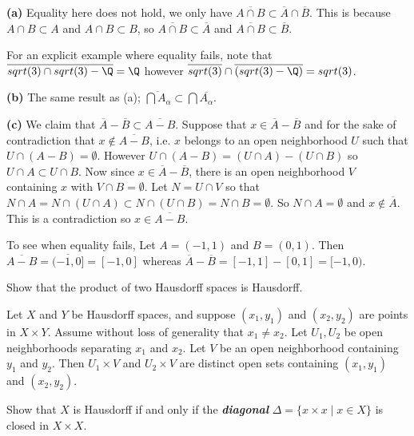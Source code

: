 \documentclass[11pt,letterpaper]{article}
\begin{document}
\begin{changemargin}{1em}{1em}
    \textbf{(a)} Equality here does not hold, we only have $\overline{A\cap B} \subset \overline{A} \cap \overline{B}$. This is because $A\cap B\subset A$ and $A\cap B\subset B$, so $\overline{A\cap B}\subset \overline{A} $ and $\overline{A\cap B}\subset \overline{B} $.
    
    For an explicit example where equality fails, note that $\overline{\R\cap \R-\Q}=\Q$ however $\overline{\R} \cap \overline{(\R-\Q)} = \R$.  
    
    \textbf{(b)} The same result as (a); $\overline{\bigcap A_\alpha} \subset \bigcap \overline{A_\alpha}$.
    
    \textbf{(c)} We claim that $\overline{A} - \overline{B} \subset \overline{A - B}$. Suppose that $x\in \overline{A}-\overline{B}$ and for the sake of contradiction that $x\not\in \overline{A - B}$, i.e. $x$ belongs to an open neighborhood $U$ such that $U\cap (A-B)=\emptyset$. However $U\cap (A-B)=(U\cap A)-(U\cap B)$ so $U\cap A\subset U\cap B$. Now since $x\in \overline{A}-\overline{B}$, there is an open neighborhood $V$ containing $x$ with $V\cap B=\emptyset$. Let $N = U\cap V$ so that $N\cap A = N\cap (U\cap A)\subset N\cap (U\cap B) = N\cap B=\emptyset$. So $N\cap A=\emptyset$ and $x\not\in \overline{A}$. This is a contradiction so $x\in \overline{A-B}$.         
    
    To see when equality fails, Let $A=(-1,1)$ and $B=(0,1)$. Then $\overline{A-B}=\overline{(-1,0]}=[-1,0]$ whereas $\overline{A}-\overline{B}=[-1,1]-[0,1]=[-1,0)$.     
    
\end{changemargin}

\begin{problem}
    Show that the product of two Hausdorff spaces is Hausdorff.
\end{problem}

\begin{changemargin}{1em}{1em}
    Let $X$ and $Y$ be Hausdorff spaces, and suppose $(x_1, y_1)$ and $(x_2, y_2)$ are points in $X\times Y$. Assume without loss of generality that $x_1\neq x_2$. Let $U_1, U_2$ be open neighborhoods separating $x_1$ and $x_2$. Let $V$ be an open neighborhood containing $y_1$ and $y_2$. Then $U_1\times V$ and $U_2\times V$ are distinct open sets containing $(x_1, y_1)$ and $(x_2, y_2)$.  
\end{changemargin}

\begin{problem}
    Show that $X$ is Hausdorff if and only if the {\em \textbf{diagonal}} $\Delta = \{ x\times x \mid x\in X\}$ is closed in $X\times X$.
\end{problem}
\end{document}
